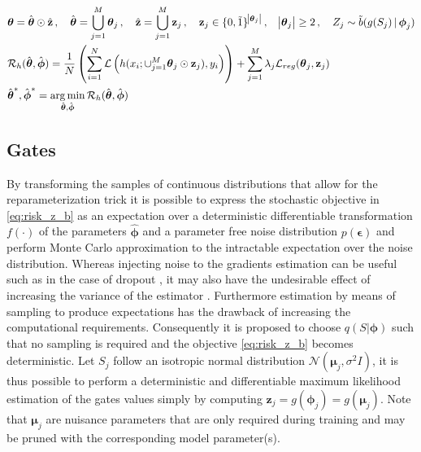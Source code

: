 \documentclass[final,1p,times]{elsarticle}
\DeclareMathOperator*{\argmin}{arg\,min}
\begin{document}
\begin{align}
& \boldsymbol{\theta} = \hat{\boldsymbol{\theta}} \odot \hat{\mathbf{z}} \, , \quad \hat{\boldsymbol{\theta}} = \bigcup\limits_{j=1}^{M} \boldsymbol{\theta}_j \, , \quad \hat{\mathbf{z}} = \bigcup\limits_{j=1}^{M} \mathbf{z}_j \, , \quad  \mathbf{z}_j \in \{0,\tilde{1}\}^{\abs{\boldsymbol{\theta}_j}} \, , \quad \abs{\boldsymbol{\theta}_j} \geq 2  \, , \quad Z_j \sim \tilde{b}(g(S_j)\, | \, \boldsymbol{\phi}_j) \label{eq:risk_z_a} \\
& \mathcal{R}_{h}(\hat{\boldsymbol{\theta}}, \hat{\boldsymbol{\phi}}) = \frac{1}{N} \left(\sum_{i=1}^{N}\mathcal{L} \left( h(x_i;\cup_{j=1}^{M}\boldsymbol{\theta}_j \odot \mathbf{z}_j),y_i \right) \right) + \sum\limits_{j=1}^M \lambda_j \mathcal{L}_{reg}(\boldsymbol{\theta}_j,\mathbf{z}_j)\label{eq:risk_z_b} \\
& \hat{\boldsymbol{\theta}}^{*} , \hat{\boldsymbol{\phi}}^{*} = \argmin_{\hat{\boldsymbol{\theta}}, \hat{\boldsymbol{\phi}}} \mathcal{R}_{h} (\hat{\boldsymbol{\theta}},\hat{\boldsymbol{\phi}}) \label{eq:risk_z_c}
\end{align}

\subsection{Gates}
\label{S:Gates}
By transforming the samples of continuous distributions that allow for the reparameterization trick \cite{Kingma2014, pmlr-v32-rezende14} it is possible to express the stochastic objective in \eqref{eq:risk_z_b} as an expectation over a deterministic differentiable transformation $f(\cdot)$ of the parameters $\hat{\boldsymbol{\phi}}$ and a parameter free noise distribution $p ( \boldsymbol{\epsilon} )$ and perform Monte Carlo approximation to the intractable expectation over the noise distribution. Whereas injecting noise to the gradients estimation can be useful such as in the case of dropout \cite{10.5555/2627435.2670313}, it may also have the undesirable effect of increasing the variance of the estimator \cite{Huang_2020_CVPR_Workshops}. Furthermore estimation by means of sampling to produce expectations has the drawback of increasing the computational requirements. Consequently it is proposed to choose $q(S|\boldsymbol{\phi})$ such that no sampling is required and the objective \eqref{eq:risk_z_b} becomes deterministic. Let $S_j$ follow an isotropic normal distribution $\mathcal{N}(\boldsymbol{\mu}_j, \sigma^2 I)$, it is thus possible to perform a deterministic and differentiable maximum likelihood estimation of the gates values simply by computing $\mathbf{z}_j = g(\boldsymbol{\phi}_j) = g(\boldsymbol{\mu}_j)$. Note that $\boldsymbol{\mu}_j$ are nuisance parameters that are only required during training and may be pruned with the corresponding model parameter(s).
\end{document}
